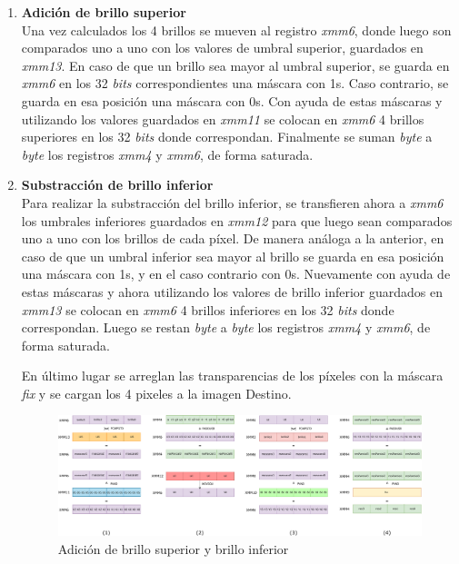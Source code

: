 \documentclass[a4paper]{article}
\begin{document}
\begin{enumerate}
 	\item \textbf{Adición de brillo superior}\\
 	
	Una vez calculados los 4 brillos se mueven al registro \textit{xmm6}, donde luego son comparados uno a uno con los valores de umbral superior, guardados en \textit{xmm13}. En caso de que un brillo sea mayor al umbral superior, se guarda en \textit{xmm6} en los 32 \textit{bits} correspondientes una máscara con 1s. Caso contrario, se guarda en esa posición una máscara con 0s. Con ayuda de estas máscaras y utilizando los valores guardados en \textit{xmm11} se colocan en \textit{xmm6} 4 brillos superiores en los 32 \textit{bits} donde correspondan. Finalmente se suman \textit{byte} a \textit{byte} los registros \textit{xmm4} y \textit{xmm6}, de forma saturada.
 	
 	\item \textbf{Substracción de brillo inferior}\\
 	
 	Para realizar la substracción del brillo inferior, se transfieren ahora a \textit{xmm6} los umbrales inferiores guardados en \textit{xmm12} para que luego sean comparados uno a uno con los brillos de cada píxel. De manera análoga a la anterior, en caso de que un umbral inferior sea mayor al brillo se guarda en esa posición una máscara con 1s, y en el caso contrario con 0s. Nuevamente con ayuda de estas máscaras y ahora utilizando los valores de brillo inferior guardados en \textit{xmm13} se colocan en \textit{xmm6} 4 brillos inferiores en los 32 \textit{bits} donde correspondan. Luego se restan \textit{byte} a \textit{byte} los registros \textit{xmm4} y \textit{xmm6}, de forma saturada.
 	
 	En último lugar se arreglan las transparencias de los píxeles con la máscara \textit{fix} y se cargan los 4 pixeles a la imagen Destino.
 	
 	\begin{figure}[h]
 		\centering
 		\includegraphics[scale = 0.37]{img/ReforzarBrillo3.pdf}
 		\caption{Adición de brillo superior y brillo inferior}
 	\end{figure}
 	
 	    
 \end{enumerate}
\end{document}
